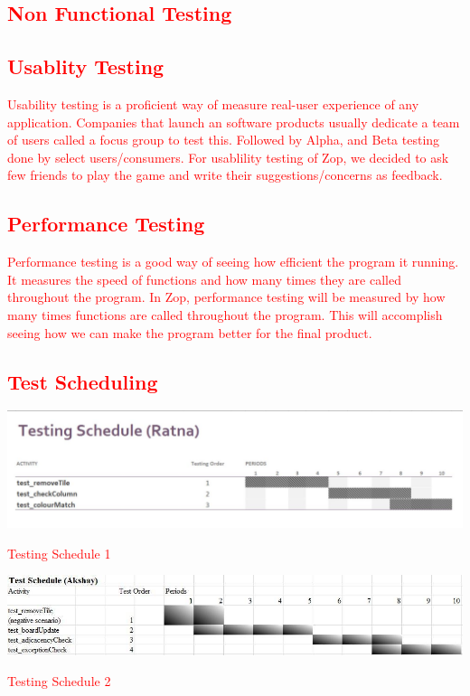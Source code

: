 \documentclass[12pt]{article}
\begin{document}
\textcolor{red}{\section{Non Functional Testing}
\subsection{Usablity Testing}
Usability testing is a proficient way of measure real-user experience of any application. Companies that launch an software products usually dedicate a team of users called a focus group to test this. Followed by Alpha, and Beta testing done by select users/consumers. For usablility testing of Zop, we decided to ask few friends to play the game and write their suggestions/concerns as feedback.
\subsection{Performance Testing}
Performance testing is a good way of seeing how efficient the program it running.  It measures the speed of functions and how many times they are called throughout the program.  In Zop, performance testing will be measured by how many times functions are called throughout the program.  This will accomplish seeing how we can make the program better for the final product.}

\textcolor{red}{\section{Test Scheduling}
\begin{table}[h!]
\includegraphics[width = 17cm]{ratnaSchedule}
\caption{Testing Schedule 1}
\end{table}
\begin{table}[h!]
\includegraphics[width = 17cm]{akshaySchedule}
\caption{Testing Schedule 2}
\end{table}}
\end{document}
